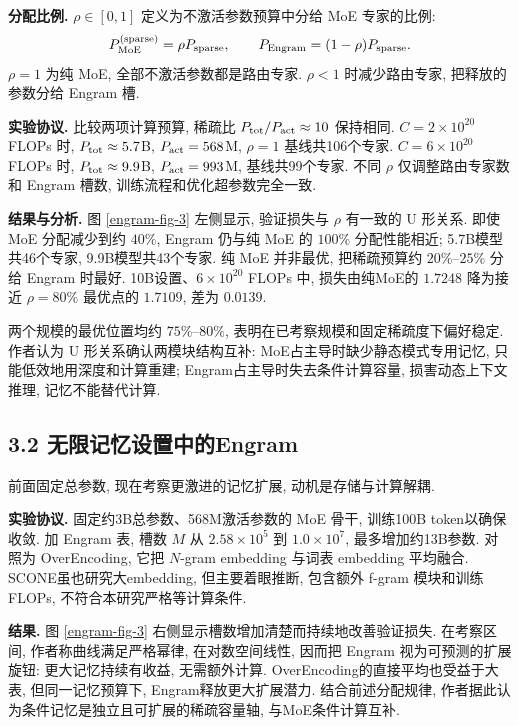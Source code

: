 \noindent\textbf{分配比例.}
$\rho\in[0,1]$ 定义为不激活参数预算中分给 MoE 专家的比例:
\begin{equation}\label{engram-eq-7}
P_{\rm MoE}^{(\rm sparse)}=\rho P_{\rm sparse},\qquad
P_{\rm Engram}=(1-\rho)P_{\rm sparse}.
\end{equation}
$\rho=1$ 为纯 MoE, 全部不激活参数都是路由专家. $\rho<1$ 时减少路由专家, 把释放的参数分给 Engram 槽.

\noindent\textbf{实验协议.}
比较两项计算预算, 稀疏比 $P_{\rm tot}/P_{\rm act}\approx10$ 保持相同. $C=2\times10^{20}$ FLOPs 时, $P_{\rm tot}\approx5.7$B, $P_{\rm act}=568$M, $\rho=1$ 基线共106个专家. $C=6\times10^{20}$ FLOPs 时, $P_{\rm tot}\approx9.9$B, $P_{\rm act}=993$M, 基线共99个专家. 不同 $\rho$ 仅调整路由专家数和 Engram 槽数, 训练流程和优化超参数完全一致.

\noindent\textbf{结果与分析.}
图 \ref{engram-fig-3} 左侧显示, 验证损失与 $\rho$ 有一致的 U 形关系. 即使 MoE 分配减少到约 $40\%$, Engram 仍与纯 MoE 的 $100\%$ 分配性能相近; 5.7B模型共46个专家, 9.9B模型共43个专家. 纯 MoE 并非最优, 把稀疏预算约 $20\%$--$25\%$ 分给 Engram 时最好. 10B设置、$6\times10^{20}$ FLOPs 中, 损失由纯MoE的 $1.7248$ 降为接近 $\rho=80\%$ 最优点的 $1.7109$, 差为 $0.0139$.

两个规模的最优位置均约 $75\%$--$80\%$, 表明在已考察规模和固定稀疏度下偏好稳定. 作者认为 U 形关系确认两模块结构互补: MoE占主导时缺少静态模式专用记忆, 只能低效地用深度和计算重建; Engram占主导时失去条件计算容量, 损害动态上下文推理, 记忆不能替代计算.

\subsection*{3.2 无限记忆设置中的Engram}
前面固定总参数, 现在考察更激进的记忆扩展, 动机是存储与计算解耦.

\noindent\textbf{实验协议.}
固定约3B总参数、568M激活参数的 MoE 骨干, 训练100B token以确保收敛. 加 Engram 表, 槽数 $M$ 从 $2.58\times10^5$ 到 $1.0\times10^7$, 最多增加约13B参数. 对照为 OverEncoding\cite{engram-huang2025over}, 它把 $N$-gram embedding 与词表 embedding 平均融合. SCONE\cite{engram-yu2025scaling}虽也研究大embedding, 但主要着眼推断, 包含额外 f-gram 模块和训练FLOPs, 不符合本研究严格等计算条件.

\noindent\textbf{结果.}
图 \ref{engram-fig-3} 右侧显示槽数增加清楚而持续地改善验证损失. 在考察区间, 作者称曲线满足严格幂律, 在对数空间线性, 因而把 Engram 视为可预测的扩展旋钮: 更大记忆持续有收益, 无需额外计算. OverEncoding的直接平均也受益于大表, 但同一记忆预算下, Engram释放更大扩展潜力. 结合前述分配规律, 作者据此认为条件记忆是独立且可扩展的稀疏容量轴, 与MoE条件计算互补.


